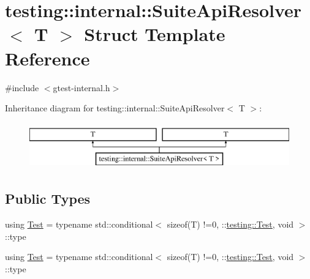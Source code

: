 \hypertarget{structtesting_1_1internal_1_1_suite_api_resolver}{}\section{testing\+::internal\+::Suite\+Api\+Resolver$<$ T $>$ Struct Template Reference}
\label{structtesting_1_1internal_1_1_suite_api_resolver}


{\ttfamily \#include $<$gtest-\/internal.\+h$>$}

Inheritance diagram for testing\+::internal\+::Suite\+Api\+Resolver$<$ T $>$\+:\begin{figure}[H]
\begin{center}
\leavevmode
\includegraphics[height=2.000000cm]{d5/db7/structtesting_1_1internal_1_1_suite_api_resolver}
\end{center}
\end{figure}
\subsection*{Public Types}
\begin{DoxyCompactItemize}
\item 
using \mbox{\hyperlink{structtesting_1_1internal_1_1_suite_api_resolver_a343c36f492a946d302b1cfc930266768}{Test}} = typename std\+::conditional$<$ sizeof(T) !=0, \+::\mbox{\hyperlink{classtesting_1_1_test}{testing\+::\+Test}}, void $>$\+::type
\item 
using \mbox{\hyperlink{structtesting_1_1internal_1_1_suite_api_resolver_a343c36f492a946d302b1cfc930266768}{Test}} = typename std\+::conditional$<$ sizeof(T) !=0, \+::\mbox{\hyperlink{classtesting_1_1_test}{testing\+::\+Test}}, void $>$\+::type
\end{DoxyCompactItemize}
